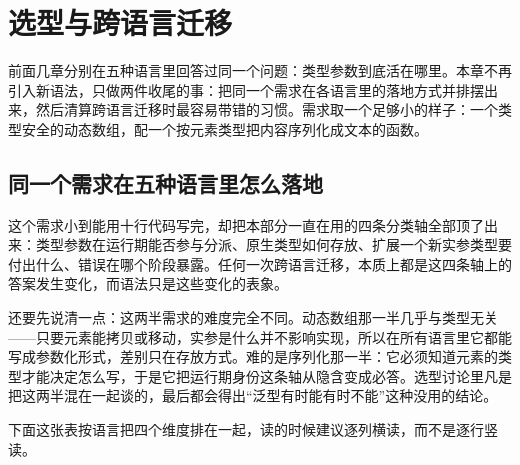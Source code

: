 \documentclass[12pt,a4paper,fontset=fandol]{ctexbook}
\begin{document}
\chapter{选型与跨语言迁移}

前面几章分别在五种语言里回答过同一个问题：类型参数到底活在哪里。本章不再引入新语法，只做两件收尾的事：把同一个需求在各语言里的落地方式并排摆出来，然后清算跨语言迁移时最容易带错的习惯。需求取一个足够小的样子：一个类型安全的动态数组，配一个按元素类型把内容序列化成文本的函数。

\section{同一个需求在五种语言里怎么落地}

这个需求小到能用十行代码写完，却把本部分一直在用的四条分类轴全部顶了出来：类型参数在运行期能否参与分派、原生类型如何存放、扩展一个新实参类型要付出什么、错误在哪个阶段暴露。任何一次跨语言迁移，本质上都是这四条轴上的答案发生变化，而语法只是这些变化的表象。

还要先说清一点：这两半需求的难度完全不同。动态数组那一半几乎与类型无关——只要元素能拷贝或移动，实参是什么并不影响实现，所以在所有语言里它都能写成参数化形式，差别只在存放方式。难的是序列化那一半：它必须知道元素的类型才能决定怎么写，于是它把运行期身份这条轴从隐含变成必答。选型讨论里凡是把这两半混在一起谈的，最后都会得出“泛型有时能有时不能”这种没用的结论。

下面这张表按语言把四个维度排在一起，读的时候建议逐列横读，而不是逐行竖读。
\end{document}
